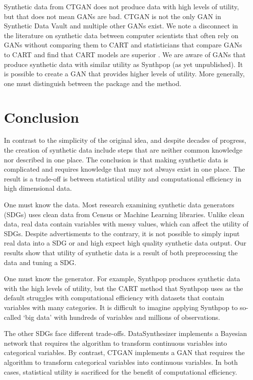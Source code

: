 \documentclass[runningheads]{llncs}
\begin{document}
Synthetic data from CTGAN does not produce data with high levels of utility, but that does not mean GANs are bad.  CTGAN is not the only GAN in Synthetic Data Vault and multiple other GANs exist.  We note a disconnect in the literature on synthetic data between computer scientists that often rely on GANs without comparing them to CART and statisticians that compare GANs to CART and find that CART models are superior \cite{drechsler202330}.  We are aware of GANs that produce synthetic data with similar utility as Synthpop (as yet unpublished).  It is possible to create a GAN that provides higher levels of utility.  More generally, one must distinguish between the package and the method.  

\section{Conclusion}\label{sec:conclusion}

In contrast to the simplicity of the original idea, and despite decades of progress, the creation of synthetic data include steps that are neither common knowledge nor described in one place.  The conclusion is that making synthetic data is complicated and requires knowledge that may not always exist in one place.  The result is a trade-off is between statistical utility and computational efficiency in high dimensional data.

One must know the data.  Most research examining synthetic data generators (SDGs) uses clean data from Census or Machine Learning libraries.  Unlike clean data, real data contain variables with messy values, which can affect the utility of SDGs.  Despite advertisments to the contrary, it is not possible to simply input real data into a SDG or and high expect high quality synthetic data output.  Our results show that utility of synthetic data is a result of both preprocessing the data and tuning a SDG.  

One must know the generator.  For example, Synthpop produces synthetic data with the high levels of utility, but the CART method that Synthpop uses as the default struggles with computational efficiency with datasets that contain variables with many categories.  It is difficult to imagine applying Synthpop to so-called `big data' with hundreds of variables and millions of observations.  

The other SDGs face different trade-offs.  DataSynthesizer implements a Bayesian network that requires the algorithm to transform continuous variables into categorical variables.  By contrast, CTGAN implements a GAN that requires the algorithm to transform categorical variables into continuous variables.  In both cases, statistical utility is sacrificed for the benefit of computational efficiency.  
\end{document}
